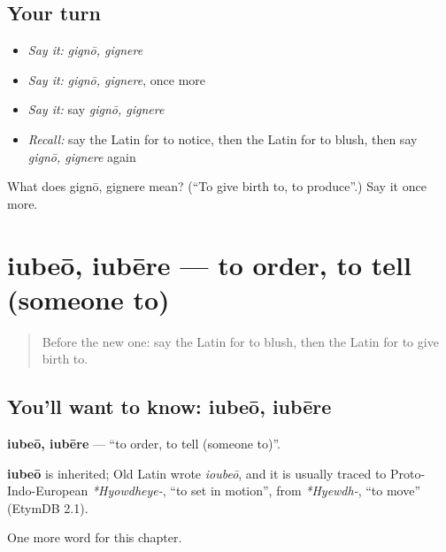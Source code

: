 \subsection*{Your turn}
\begin{itemize}
\raggedright
  \item \emph{Say it:} \emph{gignō, gignere}
  \item \emph{Say it:} \emph{gignō, gignere}, once more
  \item \emph{Say it:} say \emph{gignō, gignere}
  \item \emph{Recall:} say the Latin for to notice, then the Latin for to blush, then say \emph{gignō, gignere} again
\end{itemize}

\begin{tcolorbox}[breakable,colback=teal!4,colframe=teal!35!black,title={Before you move on}]
What does gignō, gignere mean? (\textquotedblleft{}To give birth to, to produce\textquotedblright{}.) Say it once more.
\end{tcolorbox}
\section[iubeō, iubēre]{iubeō, iubēre — to order, to tell (someone to)}

\label{lesson:LA-C261-iubeo}



\begin{quote}
Before the new one: say the Latin for to blush, then the Latin for to give birth to.
\end{quote}

\subsection*{You'll want to know: iubeō, iubēre}
\textbf{iubeō, iubēre} — \textquotedblleft{}to order, to tell (someone to)\textquotedblright{}.

\begin{cousinweb}
\textbf{iubeō} is inherited; Old Latin wrote \emph{ioubeō}, and it is usually traced to Proto-Indo-European \emph{*Hyowdheye-}, \textquotedblleft{}to set in motion\textquotedblright{}, from \emph{*Hyewdh-}, \textquotedblleft{}to move\textquotedblright{} (EtymDB 2.1).
\end{cousinweb}

\begin{grammarlens}[title={What you've built}]
One more word for this chapter.
\end{grammarlens}

